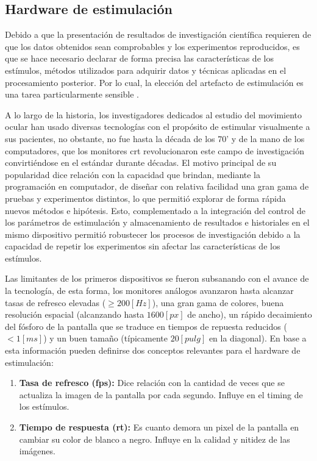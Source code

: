 \documentclass[../main.tex]{subfiles}
\begin{document}
		\subsection{Hardware de estimulación}
		\label{sub:02_hardware_de_estimulacion}
			Debido a que la presentación de resultados de investigación científica requieren de que los datos obtenidos sean comprobables y los experimentos reproducidos, es que se hace necesario declarar de forma precisa las características de los estímulos, métodos utilizados para adquirir datos y técnicas aplicadas en el procesamiento posterior. Por lo cual, la elección del artefacto de estimulación es una tarea particularmente sensible \cite{article:monitor_beuer}.

			A lo largo de la historia, los investigadores dedicados al estudio del movimiento ocular han usado diversas tecnologías con el propósito de estimular visualmente a sus pacientes, no obstante, no fue hasta la década de los 70' y de la mano de los computadores, que los monitores \acrshort{crt} revolucionaron este campo de investigación convirtiéndose en el estándar durante décadas. El motivo principal de su popularidad dice relación con la capacidad que brindan, mediante la programación en computador, de diseñar con relativa facilidad una gran gama de pruebas y experimentos distintos, lo que permitió explorar de forma rápida nuevos métodos e hipótesis. Esto, complementado a la integración del control de los parámetros de estimulación y almacenamiento de resultados e historiales en el mismo dispositivo permitió robustecer los procesos de investigación debido a la capacidad de repetir los experimentos sin afectar las características de los estímulos. 

			Las limitantes de los primeros dispositivos se fueron subsanando con el avance de la tecnología, de esta forma, los monitores análogos avanzaron hasta alcanzar tasas de refresco elevadas ($\geq 200[Hz]$), una gran gama de colores, buena resolución espacial (alcanzando hasta $1600[px]$ de ancho), un rápido decaimiento del fósforo de la pantalla que se traduce en tiempos de repuesta reducidos ($< 1[ms]$) y un buen tamaño (típicamente $20[pulg]$ en la diagonal). En base a esta información pueden definirse dos conceptos relevantes para el hardware de estimulación: 
			\begin{enumerate}\setlength\itemsep{-0.2em}
				\item \textbf{Tasa de refresco (\acrshort{fps}):} Dice relación con la cantidad de veces que se actualiza la imagen de la pantalla por cada segundo. Influye en el timing de los estímulos.
				\item \textbf{Tiempo de respuesta (\acrshort{rt}):} Es cuanto demora un pixel de la pantalla en cambiar su color de blanco a negro. Influye en la calidad y nitidez de las imágenes. 
			\end{enumerate}
\end{document}
